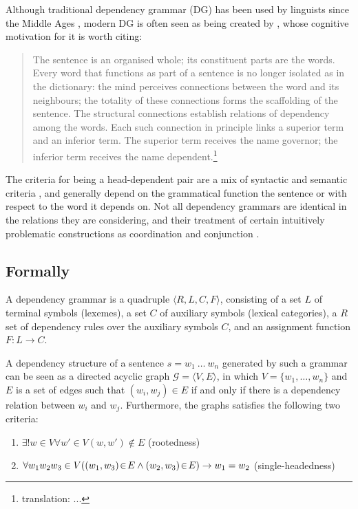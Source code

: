 \documentclass{report}
\theoremstyle{definition}
\theoremstyle{plain}
\begin{document}
Although traditional dependency grammar (DG) has been used by linguists since the Middle Ages \cite{covington1990dependency}, modern DG is often seen as being created by \cite{tesniere1959elements}, whose cognitive motivation for it is worth citing:

\begin{quote}
The sentence is an organised whole; its constituent parts are the words. Every word that functions as part of a sentence is no longer isolated as in the dictionary: the mind perceives connections between the word and its neighbours; the totality of these connections forms the scaffolding of the sentence. The structural connections establish relations of dependency among the words. Each such connection in principle links a superior term and an inferior term. The superior term receives the name governor; the inferior term receives the name dependent.\footnote{translation: ...}
\end{quote}

The criteria for being a head-dependent pair are a mix of syntactic and semantic criteria \citep{nivre2005dependency}, and generally depend on the grammatical function the sentence or with respect to the word it depends on. Not all dependency grammars are identical in the relations they are considering, and their treatment of certain intuitively problematic constructions as coordination and conjunction \citep{nivre2005dependency}.

\subsection{Formally}

A dependency grammar is a quadruple $\langle R,L,C,F\rangle$, consisting of a set $L$ of terminal symbols (lexemes), a set $C$ of auxiliary symbols (lexical categories), a $R$ set of dependency rules over the auxiliary symbols $C$, and an assignment function $F : L\rightarrow C$.\citep{hays1964dependency,gaifman1965dependency}

A dependency structure of a sentence $s = w_1~\ldots~w_n$ generated by such a grammar can be seen as a directed acyclic graph $\mathcal{G} = \langle V, E\rangle$, in which $V = \{w_1, \ldots,w_n\}$ and $E$ is a set of edges such that $(w_i,w_j)\in E$ if and only if there is a dependency relation between $w_i$ and $w_j$. Furthermore, the graphs satisfies the following two criteria:
\begin{enumerate}
\item $\exists! w\in V \forall w'\in V (w,w')\notin E$ (rootedness)
\item $\forall w_1 w_2 w_3 \in V( (w_1,w_3)\negthinspace\in\negthinspace E \land (w_2,w_3)\negthinspace \in\negthinspace E ) \rightarrow w_1 = w_2$ (single-headedness)
\end{enumerate} 
\end{document}
